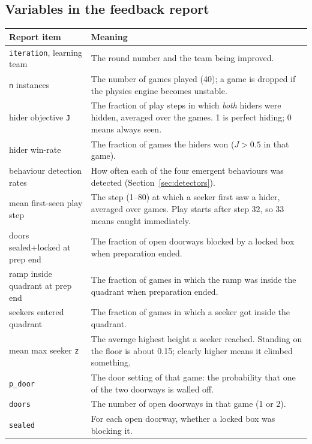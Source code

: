 \documentclass[11pt]{article}
\begin{document}
\subsection{Variables in the feedback report}

\begin{tabularx}{\linewidth}{@{}l Y@{}}
  \toprule
  Report item & Meaning \\
  \midrule
  \texttt{iteration}, learning team & The round number and the team being improved. \\
  \texttt{n} instances & The number of games played (40); a game is dropped if the physics engine
                         becomes unstable. \\
  hider objective \texttt{J} & The fraction of play steps in which \emph{both} hiders were hidden,
                         averaged over the games. 1 is perfect hiding; 0 means always seen. \\
  hider win-rate & The fraction of games the hiders won ($J > 0.5$ in that game). \\
  behaviour detection rates & How often each of the four emergent behaviours was detected
                         (Section~\ref{sec:detectors}). \\
  mean first-seen play step & The step (1--80) at which a seeker first saw a hider, averaged over
                         games. Play starts after step 32, so 33 means caught immediately. \\
  doors sealed+locked at prep end & The fraction of open doorways blocked by a locked box when
                         preparation ended. \\
  ramp inside quadrant at prep end & The fraction of games in which the ramp was inside the quadrant
                         when preparation ended. \\
  seekers entered quadrant & The fraction of games in which a seeker got inside the quadrant. \\
  mean max seeker \texttt{z} & The average highest height a seeker reached. Standing on the floor is
                         about 0.15; clearly higher means it climbed something. \\
  \midrule
  \texttt{p\_door} & The door setting of that game: the probability that one of the two doorways is
                         walled off. \\
  \texttt{doors} & The number of open doorways in that game (1 or 2). \\
  \texttt{sealed} & For each open doorway, whether a locked box was blocking it. \\

\end{tabularx}
\end{document}
